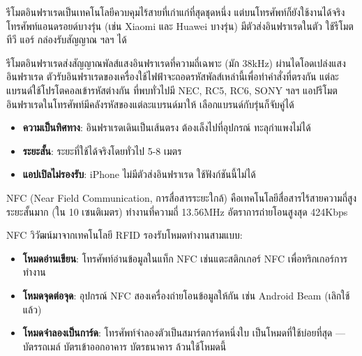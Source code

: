 
รีโมตอินฟราเรดเป็นเทคโนโลยีควบคุมไร้สายที่เก่าแก่ที่สุดชุดหนึ่ง แต่บนโทรศัพท์ก็ยังใช้งานได้จริง โทรศัพท์แอนดรอยด์บางรุ่น (เช่น Xiaomi และ Huawei บางรุ่น) มีตัวส่งอินฟราเรดในตัว ใช้รีโมตทีวี แอร์ กล่องรับสัญญาณ ฯลฯ ได้


รีโมตอินฟราเรดส่งสัญญาณพัลส์แสงอินฟราเรดที่ความถี่เฉพาะ (มัก 38kHz) ผ่านไดโอดเปล่งแสงอินฟราเรด ตัวรับอินฟราเรดของเครื่องใช้ไฟฟ้าจะถอดรหัสพัลส์เหล่านี้เพื่อทำคำสั่งที่ตรงกัน แต่ละแบรนด์ใช้โปรโตคอลเข้ารหัสต่างกัน ที่พบทั่วไปมี NEC, RC5, RC6, SONY ฯลฯ แอปรีโมตอินฟราเรดในโทรศัพท์มีคลังรหัสของแต่ละแบรนด์มาให้ เลือกแบรนด์กับรุ่นก็จับคู่ได้


\begin{itemize}
  \item \textbf{ความเป็นทิศทาง}: อินฟราเรดเดินเป็นเส้นตรง ต้องเล็งไปที่อุปกรณ์ ทะลุกำแพงไม่ได้
  \item \textbf{ระยะสั้น}: ระยะที่ใช้ได้จริงโดยทั่วไป 5-8 เมตร
  \item \textbf{แอปเปิลไม่รองรับ}: iPhone ไม่มีตัวส่งอินฟราเรด ใช้ฟังก์ชันนี้ไม่ได้
\end{itemize}


NFC (Near Field Communication, การสื่อสารระยะใกล้) คือเทคโนโลยีสื่อสารไร้สายความถี่สูงระยะสั้นมาก (ใน 10 เซนติเมตร) ทำงานที่ความถี่ 13.56MHz อัตราการถ่ายโอนสูงสุด 424Kbps


NFC วิวัฒน์มาจากเทคโนโลยี RFID รองรับโหมดทำงานสามแบบ:

\begin{itemize}
  \item \textbf{โหมดอ่านเขียน}: โทรศัพท์อ่านข้อมูลในแท็ก NFC เช่นแตะสติกเกอร์ NFC เพื่อทริกเกอร์การทำงาน
  \item \textbf{โหมดจุดต่อจุด}: อุปกรณ์ NFC สองเครื่องถ่ายโอนข้อมูลให้กัน เช่น Android Beam (เลิกใช้แล้ว)
  \item \textbf{โหมดจำลองเป็นการ์ด}: โทรศัพท์จำลองตัวเป็นสมาร์ตการ์ดหนึ่งใบ เป็นโหมดที่ใช้บ่อยที่สุด — บัตรรถเมล์ บัตรเข้าออกอาคาร บัตรธนาคาร ล้วนใช้โหมดนี้
\end{itemize}


